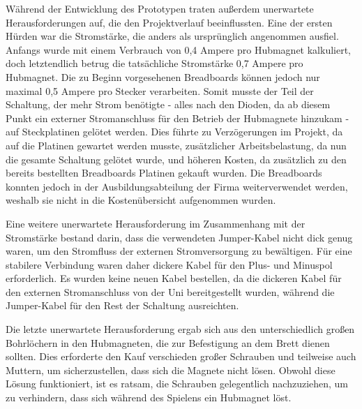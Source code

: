Während der Entwicklung des Prototypen traten außerdem unerwartete Herausforderungen auf, die den Projektverlauf beeinflussten.
Eine der ersten Hürden war die Stromstärke, die anders als ursprünglich angenommen ausfiel. Anfangs wurde mit einem
Verbrauch von 0,4 Ampere pro Hubmagnet kalkuliert, doch letztendlich betrug die tatsächliche Stromstärke 0,7 Ampere pro
Hubmagnet. Die zu Beginn vorgesehenen Breadboards können jedoch nur maximal 0,5 Ampere pro Stecker verarbeiten.
Somit musste der Teil der Schaltung, der mehr Strom benötigte - alles nach den Dioden, da ab diesem Punkt ein externer
Stromanschluss für den Betrieb der Hubmagnete hinzukam - auf Steckplatinen gelötet werden. Dies führte zu Verzögerungen
im Projekt, da auf die Platinen gewartet werden musste, zusätzlicher Arbeitsbelastung, da nun die gesamte Schaltung gelötet
wurde, und höheren Kosten, da zusätzlich zu den bereits bestellten Breadboards Platinen gekauft wurden.
Die Breadboards konnten jedoch in der Ausbildungsabteilung der Firma weiterverwendet werden, weshalb sie nicht in die
Kostenübersicht aufgenommen wurden.

Eine weitere unerwartete Herausforderung im Zusammenhang mit der Stromstärke bestand darin, dass die verwendeten
Jumper-Kabel nicht dick genug waren, um den Stromfluss der externen Stromversorgung zu bewältigen. Für eine stabilere
Verbindung waren daher dickere Kabel für den Plus- und Minuspol erforderlich. Es wurden keine neuen Kabel bestellen,
da die dickeren Kabel für den externen Stromanschluss von der Uni bereitgestellt wurden, während die Jumper-Kabel für den
Rest der Schaltung ausreichten.

Die letzte unerwartete Herausforderung ergab sich aus den unterschiedlich großen Bohrlöchern in den Hubmagneten, die zur
Befestigung an dem Brett dienen sollten. Dies erforderte den Kauf verschieden großer Schrauben und teilweise auch Muttern,
um sicherzustellen, dass sich die Magnete nicht lösen. Obwohl diese Lösung funktioniert, ist es ratsam, die Schrauben
gelegentlich nachzuziehen, um zu verhindern, dass sich während des Spielens ein Hubmagnet löst.

